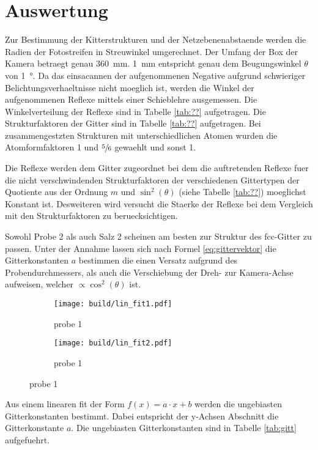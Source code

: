 \section{Auswertung}\label{sec:Auswertung}

Zur Bestimmung der Kitterstrukturen und der Netzebenenabstaende werden die
Radien der Fotostreifen in Streuwinkel umgerechnet. Der Umfang der Box der 
Kamera betraegt genau \SI{360}{\milli\meter}. \SI{1}{\milli\meter}
entspricht genau dem Beugungswinkel $\theta$ von \SI{1}{\degree}. Da das
einsacannen der aufgenommenen Negative aufgrund schwieriger
Belichtungsverhaeltnisse nicht moeglich ist, werden die Winkel der aufgenommenen
Reflexe mittels einer Schieblehre ausgemessen. Die Winkelverteilung der Reflexe
sind in Tabelle \ref{tab:??} aufgetragen. Die Strukturfaktoren der Gitter sind 
in Tabelle \ref{tab:??} aufgetragen. Bei zusammengestzten Strukturen mit 
unterschiedlichen Atomen wurden die Atomformfaktoren 1 und $\sfrac{5}{6}$ 
gewaehlt und sonst 1. 

Die Reflexe werden dem Gitter zugeordnet bei dem die auftretenden Reflexe fuer
die nicht verschwindenden Strukturfaktoren der verschiedenen Gittertypen der 
Quotiente aus der Ordnung $m$ und $\sin^2(\theta)$ (siehe Tabelle \ref{tab:??}) moeglichst Konstant ist.
Desweiteren wird versucht die Staerke der Reflexe bei dem Vergleich mit den
Strukturfaktoren zu beruecksichtigen. 

Sowohl Probe 2 als auch Salz 2 scheinen am besten zur Struktur des fcc-Gitter zu
passen. Unter der Annahme lassen sich nach Formel \ref{eq:gittervektor}
die Gitterkonstanten $a$ bestimmen die einen Versatz aufgrund des
Probendurchmessers, als auch die Verschiebung der Dreh- zur Kamera-Achse 
aufweisen, welcher $\propto \cos^2(\theta)$ ist.
\begin{figure}[ht]
		\centering
		\begin{subfigure}{0.49\textwidth}
				\centering
				\texttt{[image: build/lin\_fit1.pdf]}
				\caption{probe 1}
				\label{fig:prb1}
		\end{subfigure}
		\begin{subfigure}{0.49\textwidth}
				\centering
				\texttt{[image: build/lin\_fit2.pdf]}
				\caption{probe 1}
				\label{fig:prb1}
		\end{subfigure}
\end{figure}

Aus einem linearen fit der Form $f(x) = a \cdot x + b$ werden die ungebiasten
Gitterkonstanten bestimmt. Dabei entspricht der y-Achsen Abschnitt die
Gitterkonstante $a$. Die ungebiasten Gitterkonstanten sind in Tabelle
\ref{tab:gitt} aufgefuehrt.

